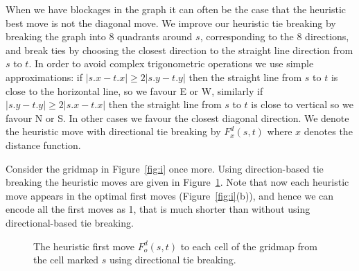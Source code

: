 {%

When we have blockages in the graph
it can often be the case that the heuristic best move
is not the diagonal move. We improve our heuristic tie breaking by breaking the graph
into 8 quadrants around $s$, corresponding to the 8 directions, and
break ties by choosing the closest direction to the
straight line direction from $s$ to $t$.
In order to avoid complex trigonometric operations
we use simple approximations:
if $|s.x - t.x| \geq 2|s.y - t.y|$ then the straight line from $s$ to $t$
is close to the horizontal line,
so we favour E or W, similarly if  $|s.y - t.y| \geq 2|s.x - t.x|$
then the straight line from $s$ to $t$
is close to vertical so we favour N or S.
In other cases we favour the closest diagonal direction. %
%
We denote the heuristic move with directional tie breaking by $F^d_x(s,t)$
where $x$ denotes the distance function.

\begin{example}
  Consider the gridmap in Figure~\ref{fig:i} once more.
  Using direction-based tie breaking the heuristic moves are given in Figure~\ref{fig:j}.
  Note that now each heuristic move appears in the optimal first moves (Figure~\ref{fig:i}(b)),
  and hence we can encode all the first moves as 1\heur, that is much shorter than without using directional-based tie breaking.
    \begin{figure}
      \centering
    \caption{The heuristic first move $F^d_o(s,t)$ to each cell of the gridmap from the cell marked $s$ using
      directional tie breaking.}
    \label{fig:j}
    \end{figure}
\end{example}
  


}
